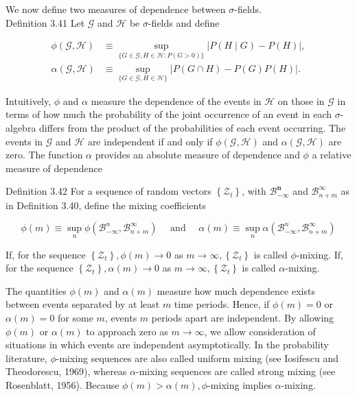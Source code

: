 \documentclass[10pt]{article}
\begin{document}
We now define two measures of dependence between $\sigma$-fields.\\
Definition 3.41 Let $\mathcal{G}$ and $\mathcal{H}$ be $\sigma$-fields and define

$$
\begin{aligned}
\phi(\mathcal{G}, \mathcal{H}) & \equiv \sup _{\{G \in \mathcal{G}, H \in \mathcal{H}: P(G>0)\}}|P(H \mid G)-P(H)|, \\
\alpha(\mathcal{G}, \mathcal{H}) & \equiv \sup _{\{G \in \mathcal{G}, H \in \mathcal{H}\}}|P(G \cap H)-P(G) P(H)| .
\end{aligned}
$$

Intuitively, $\phi$ and $\alpha$ measure the dependence of the events in $\mathcal{H}$ on those in $\mathcal{G}$ in terms of how much the probability of the joint occurrence of an event in each $\sigma$-algebra differs from the product of the probabilities of each event occurring. The events in $\mathcal{G}$ and $\mathcal{H}$ are independent if and only if $\phi(\mathcal{G}, \mathcal{H})$ and $\alpha(\mathcal{G}, \mathcal{H})$ are zero. The function $\alpha$ provides an absolute measure of dependence and $\phi$ a relative measure of dependence

Definition 3.42 For a sequence of random vectors $\left\{\mathcal{Z}_{t}\right\}$, with $\mathcal{B}_{-\infty}^{\boldsymbol{n}}$ and $\mathcal{B}_{n+m}^{\infty}$ as in Definition 3.40, define the mixing coefficients

$$
\phi(m) \equiv \sup _{n} \phi\left(\mathcal{B}_{-\infty}^{n}, \mathcal{B}_{n+m}^{\infty}\right) \quad \text { and } \quad \alpha(m) \equiv \sup _{n} \alpha\left(\mathcal{B}_{-\infty}^{n}, \mathcal{B}_{n+m}^{\infty}\right)
$$

If, for the sequence $\left\{\mathcal{Z}_{t}\right\}, \phi(m) \rightarrow 0$ as $m \rightarrow \infty,\left\{\mathcal{Z}_{t}\right\}$ is called $\phi$-mixing. If, for the sequence $\left\{\mathcal{Z}_{t}\right\}, \alpha(m) \rightarrow 0$ as $m \rightarrow \infty,\left\{\mathcal{Z}_{t}\right\}$ is called $\alpha$-mixing.

The quantities $\phi(m)$ and $\alpha(m)$ measure how much dependence exists between events separated by at least $m$ time periods. Hence, if $\phi(m)=0$ or $\alpha(m)=0$ for some $m$, events $m$ periods apart are independent. By allowing $\phi(m)$ or $\alpha(m)$ to approach zero as $m \rightarrow \infty$, we allow consideration of situations in which events are independent asymptotically. In the probability literature, $\phi$-mixing sequences are also called uniform mixing (see Iosifescu and Theodorescu, 1969), whereas $\alpha$-mixing sequences are called strong mixing (see Rosenblatt, 1956). Because $\phi(m)>\alpha(m), \phi$-mixing implies $\alpha$-mixing.
\end{document}
